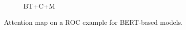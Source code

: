 \begin{figure}[th!]
\begin{subfigure}[b]{0.22\textwidth}
\caption{BT+C+M}
\label{fig:roc_cm}
\end{subfigure}
\caption{Attention map on a ROC example for BERT-based models.}
\label{fig:roc_bert}
\end{figure}



